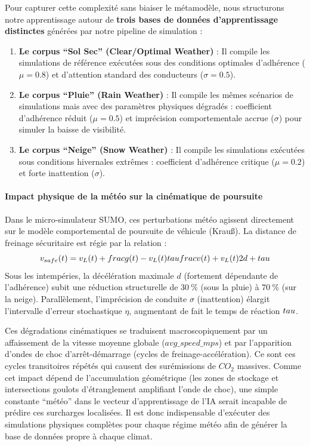 \documentclass[10pt, a4paper]{article}
\providecommand{\tightlist}{}
\begin{document}
Pour capturer cette complexité sans biaiser le métamodèle, nous
structurons notre apprentissage autour de \textbf{trois bases de données
d'apprentissage distinctes} générées par notre pipeline de simulation :

\begin{enumerate}
\def\labelenumi{\arabic{enumi}.}
\tightlist
\item
  \textbf{Le corpus ``Sol Sec'' (Clear/Optimal Weather)} : Il compile
  les simulations de référence exécutées sous des conditions optimales
  d'adhérence (\(\mu = 0.8\)) et d'attention standard des conducteurs
  (\(\sigma = 0.5\)).
\item
  \textbf{Le corpus ``Pluie'' (Rain Weather)} : Il compile les mêmes
  scénarios de simulations mais avec des paramètres physiques dégradés :
  coefficient d'adhérence réduit (\(\mu = 0.5\)) et imprécision
  comportementale accrue (\(\sigma\)) pour simuler la baisse de
  visibilité.
\item
  \textbf{Le corpus ``Neige'' (Snow Weather)} : Il compile les
  simulations exécutées sous conditions hivernales extrêmes :
  coefficient d'adhérence critique (\(\mu = 0.2\)) et forte inattention
  (\(\sigma\)).
\end{enumerate}

\paragraph{Impact physique de la météo sur la cinématique de
poursuite}\label{impact-physique-de-la-muxe9tuxe9o-sur-la-cinuxe9matique-de-poursuite}

Dans le micro-simulateur SUMO, ces perturbations météo agissent
directement sur le modèle comportemental de poursuite de véhicule
(Krauß). La distance de freinage sécuritaire est régie par la relation :
\[v_{safe}(t) = v_L(t) + \\frac{g(t) - v_L(t)\\tau}{\\frac{v(t) + v_L(t)}{2d} + \\tau}\]
Sous les intempéries, la décélération maximale \(d\) (fortement
dépendante de l'adhérence) subit une réduction structurelle de
\(30\ \%\) (sous la pluie) à \(70\ \%\) (sur la neige). Parallèlement,
l'imprécision de conduite \(\sigma\) (inattention) élargit l'intervalle
d'erreur stochastique \(\eta\), augmentant de fait le temps de réaction
\(\\tau\).

Ces dégradations cinématiques se traduisent macroscopiquement par un
affaissement de la vitesse moyenne globale (\(avg\_speed\_mps\)) et par
l'apparition d'ondes de choc d'arrêt-démarrage (cycles de
freinage-accélération). Ce sont ces cycles transitoires répétés qui
causent des surémissions de \(CO_2\) massives. Comme cet impact dépend
de l'accumulation géométrique (les zones de stockage et intersections
goulots d'étranglement amplifiant l'onde de choc), une simple constante
``météo'' dans le vecteur d'apprentissage de l'IA serait incapable de
prédire ces surcharges localisées. Il est donc indispensable d'exécuter
des simulations physiques complètes pour chaque régime météo afin de
générer la base de données propre à chaque climat.
\end{document}
